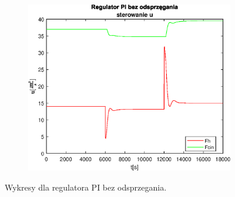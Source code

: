 \begin{figure}[h!]
   \begin{subfigure}[b]{0.4\textwidth}
      \includegraphics[width=1\linewidth]{img/PI/noDecoupler/noDisturbance/PINoDecouplerControl2Lintrue.eps}
      \caption{}
      \label{fig:fig:PINodDecoupler2Lintrue3}
   \end{subfigure}
       
   \caption{Wykresy dla regulatora PI bez odsprzegania.}
   \label{fig:PINodDecoupler2Lintrue}
\end{figure}
           
